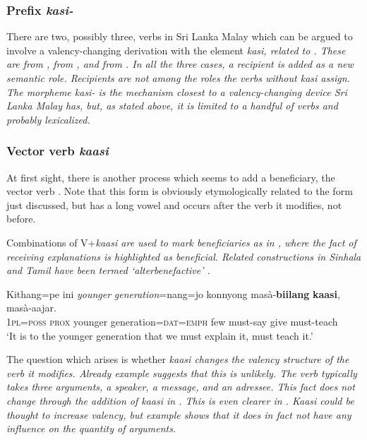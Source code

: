 \documentclass[a4paper,10pt]{article}
\begin{document}
\subsubsection{Prefix \em kasi-\em}
There are two, possibly three, verbs in Sri Lanka Malay which can be argued to involve a valency-changing derivation with the element \em kasi\em, related to  \citep{Nordhofffcsvc}. These are   from ,  from , and  from . In all the three cases, a recipient is added as a new semantic role. Recipients are not among the roles the verbs without \em kasi \em assign. The morpheme \em kasi- \em is the mechanism closest to a valency-changing device Sri Lanka Malay has, but, as stated above, it is limited to a handful of verbs and probably lexicalized.

\subsubsection{Vector verb \em kaasi\em}
At first sight, there is another process which seems to add a beneficiary, the vector verb . Note that this form is obviously etymologically related to the form just discussed, but has a long vowel and occurs after the verb it modifies, not before.

Combinations of V+\em kaasi \em are used to mark beneficiaries as in , where the fact of receiving explanations is highlighted as beneficial. Related constructions in Sinhala and Tamil have been termed `alterbenefactive' \citep[227]{Lehmann1989tamil}.

\ea\label{ex:valencychange:kaasi:biilang}
   \gll Kithang=pe     ini      {\em younger} {\em generation}=nang=jo     konnyong masà-\textbf{biilang} \textbf{kaasi}, masà-aajar. \\
    \textsc{1pl}=\textsc{poss} \textsc{prox} younger generation=\textsc{dat}=\textsc{emph} few must-say give must-teach\\
 `It is to the younger generation that we must explain it, must teach it.' 
\z

The question which arises is whether \em kaasi \em changes the valency structure of the verb it modifies. Already example  suggests that this is unlikely. The verb  typically takes three arguments, a speaker, a message, and an adressee. This fact does not change through the addition of \em kaasi \em in . This is even clearer in . \em Kaasi \em could be thought to increase valency, but example  shows that it does in fact not have any influence on the quantity of arguments.
\end{document}
